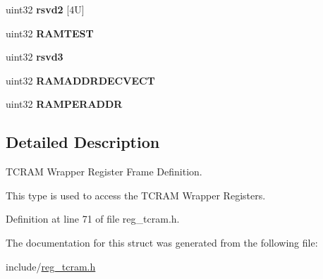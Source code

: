 \begin{DoxyCompactItemize}
\mbox{\label{structtcramBase_a8500907360faf10e7331f9f3f5d1c9c9}} 
uint32 {\bfseries rsvd2} \mbox{[}4\+U\mbox{]}
\item 
\mbox{\label{structtcramBase_ab73f9c064ce86faa98614a741828a9e2}} 
uint32 {\bfseries R\+A\+M\+T\+E\+ST}
\item 
\mbox{\label{structtcramBase_a65d85017ff4b449cc59a7d0e44f11a68}} 
uint32 {\bfseries rsvd3}
\item 
\mbox{\label{structtcramBase_a5186d6e25896cddd3a55667c909febba}} 
uint32 {\bfseries R\+A\+M\+A\+D\+D\+R\+D\+E\+C\+V\+E\+CT}
\item 
\mbox{\label{structtcramBase_aa8b6f1aa98fc84b55adb082852a9caa0}} 
uint32 {\bfseries R\+A\+M\+P\+E\+R\+A\+D\+DR}
\end{DoxyCompactItemize}


\subsection{Detailed Description}
T\+C\+R\+AM Wrapper Register Frame Definition. 

This type is used to access the T\+C\+R\+AM Wrapper Registers. 

Definition at line 71 of file reg\+\_\+tcram.\+h.



The documentation for this struct was generated from the following file\+:\begin{DoxyCompactItemize}
\item 
include/\mbox{\hyperlink{reg__tcram_8h}{reg\+\_\+tcram.\+h}}\end{DoxyCompactItemize}

